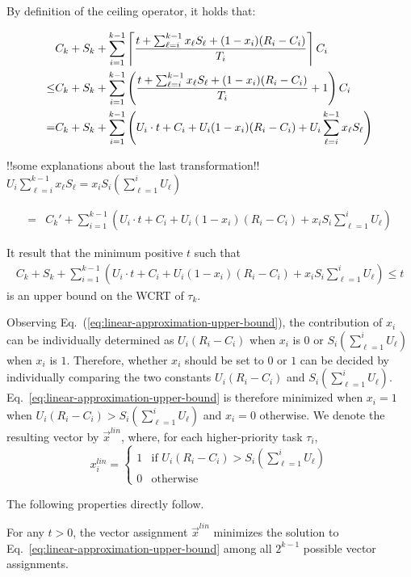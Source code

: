 By definition of the ceiling operator, it holds that:
{\small \begin{align*}
&C_k + S_k + \sum_{i=1}^{k-1}\left\lceil{\frac{t+\sum_{\ell=i}^{k-1}x_\ell S_\ell+(1-x_i)(R_i-C_i)}{T_i}}\right\rceil C_i \nonumber\\
\leq& C_k + S_k  +   \sum_{i=1}^{k-1} \left(\frac{t+\sum_{\ell=i}^{k-1}x_\ell S_\ell +(1-x_i)(R_i-C_i)}{T_i} +1\right) C_i \nonumber\\
=& C_k + S_k  + \sum_{i=1}^{k-1} \left(U_i\cdot t + C_i+U_i (1-x_i)(R_i-C_i) + U_i\sum_{\ell=i}^{k-1}x_\ell S_\ell \right)
\end{align*}

!!some explanations about the last transformation!! 
$U_i\sum_{\ell=i}^{k-1}x_\ell S_\ell = x_i S_i\left(\sum_{\ell=1}^{i}U_\ell \right)$

\begin{align*}
=& C_k' + \sum_{i=1}^{k-1}  \left(U_i\cdot t + C_i + U_i (1-x_i)(R_i-C_i) + x_i S_i\sum_{\ell=1}^{i}U_\ell \right)
\end{align*}

It result that the minimum positive $t$ such that
\begin{align}
\label{eq:linear-approximation-upper-bound}
C_k + S_k + \sum_{i=1}^{k-1}  \left(U_i\cdot t + C_i + U_i (1-x_i)(R_i-C_i) + x_i S_i\sum_{\ell=1}^{i}U_\ell \right) \leq t
\end{align}
is an upper bound on the WCRT of $\tau_k$.

Observing Eq.~(\ref{eq:linear-approximation-upper-bound}), the
contribution of $x_i$ can be individually determined as $U_i(R_i-C_i)$
when $x_i$ is $0$ or $S_i(\sum_{\ell=1}^{i}U_\ell)$ when $x_i$ is
$1$. Therefore, whether $x_i$ should be set to $0$ or $1$ can be 
decided by individually comparing the two constants
$U_i(R_i-C_i)$ and $S_i(\sum_{\ell=1}^{i}U_\ell)$. Eq.~\eqref{eq:linear-approximation-upper-bound} is therefore minimized when $x_i=1$ when $U_i(R_i-C_i) > S_i(\sum_{\ell=1}^{i}U_\ell)$ and $x_i = 0$ otherwise. We denote the resulting vector by $\vec{x}^{\mathit{lin}}$, where, for
each higher-priority task $\tau_i$,
\begin{equation*}
x_i^{\mathit{lin}} =
\begin{cases}
1 & \text{if~} U_i(R_i-C_i) > S_i(\sum_{\ell=1}^{i}U_\ell) \\
0 & \text{otherwise}
\end{cases}
\end{equation*}

The following properties directly follow.
\begin{Property}
For any $t > 0$, the vector assignment $\vec{x}^{\mathit{lin}}$ minimizes
  the solution to Eq.~\eqref{eq:linear-approximation-upper-bound} among all $2^{k-1}$ possible vector assignments.
\end{Property}

}
